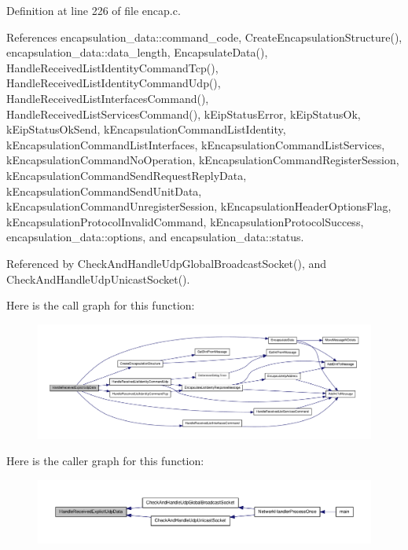 \-Definition at line 226 of file encap.\-c.



\-References encapsulation\-\_\-data\-::command\-\_\-code, \-Create\-Encapsulation\-Structure(), encapsulation\-\_\-data\-::data\-\_\-length, \-Encapsulate\-Data(), \-Handle\-Received\-List\-Identity\-Command\-Tcp(), \-Handle\-Received\-List\-Identity\-Command\-Udp(), \-Handle\-Received\-List\-Interfaces\-Command(), \-Handle\-Received\-List\-Services\-Command(), k\-Eip\-Status\-Error, k\-Eip\-Status\-Ok, k\-Eip\-Status\-Ok\-Send, k\-Encapsulation\-Command\-List\-Identity, k\-Encapsulation\-Command\-List\-Interfaces, k\-Encapsulation\-Command\-List\-Services, k\-Encapsulation\-Command\-No\-Operation, k\-Encapsulation\-Command\-Register\-Session, k\-Encapsulation\-Command\-Send\-Request\-Reply\-Data, k\-Encapsulation\-Command\-Send\-Unit\-Data, k\-Encapsulation\-Command\-Unregister\-Session, k\-Encapsulation\-Header\-Options\-Flag, k\-Encapsulation\-Protocol\-Invalid\-Command, k\-Encapsulation\-Protocol\-Success, encapsulation\-\_\-data\-::options, and encapsulation\-\_\-data\-::status.



\-Referenced by \-Check\-And\-Handle\-Udp\-Global\-Broadcast\-Socket(), and \-Check\-And\-Handle\-Udp\-Unicast\-Socket().



\-Here is the call graph for this function\-:
\nopagebreak
\begin{figure}[H]
\begin{center}
\leavevmode
\includegraphics[width=350pt]{d2/dc9/group__CIP__API_gad2fa74193023adadbbffe5bf0ef7f6ee_cgraph}
\end{center}
\end{figure}




\-Here is the caller graph for this function\-:
\nopagebreak
\begin{figure}[H]
\begin{center}
\leavevmode
\includegraphics[width=350pt]{d2/dc9/group__CIP__API_gad2fa74193023adadbbffe5bf0ef7f6ee_icgraph}
\end{center}
\end{figure}


